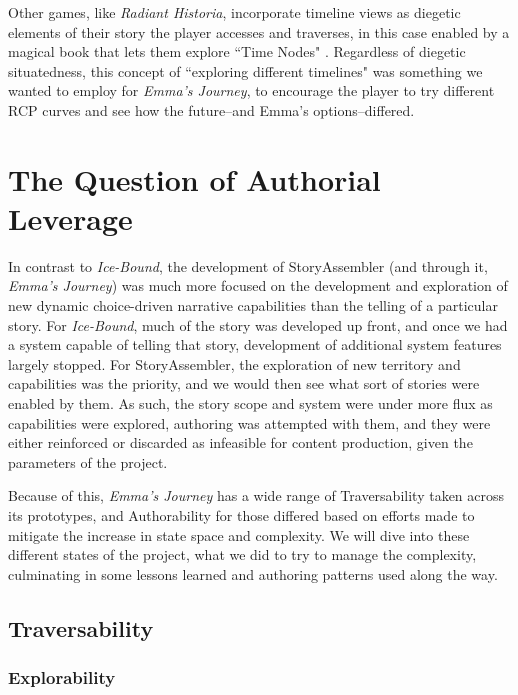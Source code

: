 
Other games, like \textit{Radiant Historia}, incorporate timeline views as diegetic elements of their story the player accesses and traverses, in this case enabled by a magical book that lets them explore ``Time Nodes" \cite{radiant_historia}. Regardless of diegetic situatedness, this concept of ``exploring different timelines" was something we wanted to employ for \textit{Emma's Journey}, to encourage the player to try different RCP curves and see how the future--and Emma's options--differed.

\section{The Question of Authorial Leverage}

In contrast to \textit{Ice-Bound}, the development of StoryAssembler (and through it, \textit{Emma's Journey}) was much more focused on the development and exploration of new dynamic choice-driven narrative capabilities than the telling of a particular story. For \textit{Ice-Bound}, much of the story was developed up front, and once we had a system capable of telling that story, development of additional system features largely stopped. For StoryAssembler, the exploration of new territory and capabilities was the priority, and we would then see what sort of stories were enabled by them. As such, the story scope and system were under more flux as capabilities were explored, authoring was attempted with them, and they were either reinforced or discarded as infeasible for content production, given the parameters of the project. 

Because of this, \textit{Emma's Journey} has a wide range of Traversability taken across its prototypes, and Authorability for those differed based on efforts made to mitigate the increase in state space and complexity. We will dive into these different states of the project, what we did to try to manage the complexity, culminating in some lessons learned and authoring patterns used along the way.

\subsection{Traversability}

\subsubsection{Explorability}

